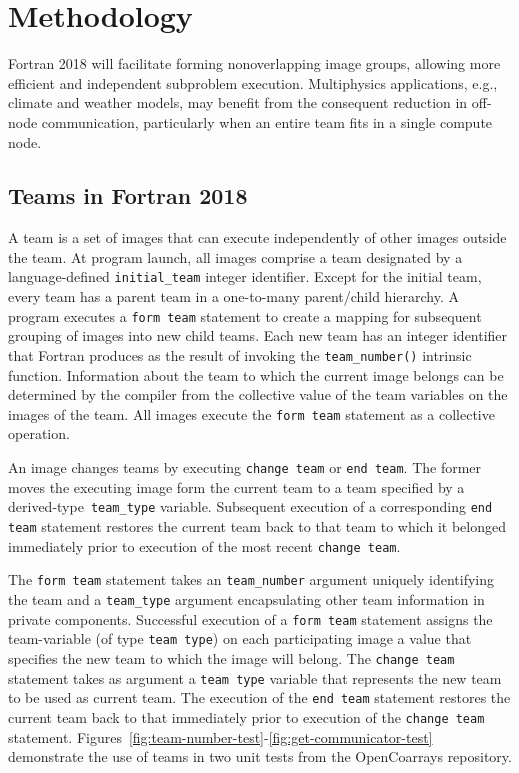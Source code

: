 
\section{Methodology}\label{sec:methodology}
Fortran 2018 will facilitate forming nonoverlapping image
groups, allowing more efficient and independent subproblem execution.
Multiphysics applications, e.g., climate and weather models, may benefit from the
consequent reduction in off-node communication, particularly when an entire team
fits in a single compute node.

\subsection{Teams in Fortran 2018}\label{teams-in-fortran-2015}
A team is a set of images that can execute independently of other images outside the team.
At program launch, all images comprise a team designated by a language-defined \texttt{initial\_team} integer identifier.
Except for the initial team, every team has a parent team in a one-to-many parent/child hierarchy.
A program executes a \texttt{form team} statement to create a mapping for subsequent grouping of images into
new child teams.  Each new team has an integer identifier that Fortran produces as the result of invoking the
\texttt{team\_number()} intrinsic function.  Information about the team to which the current image belongs can be
determined by the compiler from the collective value of the team variables on the images of the team.
All images execute the \texttt{form team} statement as a collective operation.

An image changes teams by executing \texttt{change team} or
\texttt{end team}. The former moves the executing image form the current team to a team
specified by a derived-type~\texttt{team\_type} variable.  Subsequent execution of a corresponding \texttt{end team}
statement restores the current team back to that team to which it belonged immediately prior to execution of the most
recent \texttt{change team}.

The \texttt{form team} statement takes an \texttt{team\_number} argument uniquely identifying the team and
a \texttt{team\_type} argument encapsulating other team information in private components.
Successful execution of a \texttt{form team} statement assigns the team-variable (of type \texttt{team type}) on each
participating image a value that specifies the new team to which the image will belong.
The \texttt{change team} statement takes as argument a \texttt{team type} variable that represents the new team to be used as
current team. The execution of the \texttt{end team} statement restores the current team back
to that immediately prior to execution of the \texttt{change team} statement.
Figures~\ref{fig:team-number-test}-\ref{fig:get-communicator-test} demonstrate the use of teams in two
unit tests from the OpenCoarrays repository.

